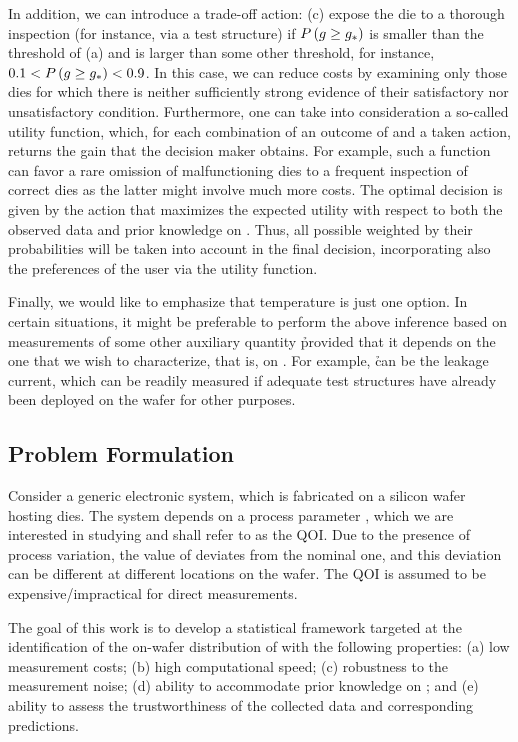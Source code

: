 In addition, we can introduce a trade-off action: (c) expose the die to a
thorough inspection (for instance, via a test structure) if $P\left(g
\geq g_*\right)$ is smaller than the threshold of (a) and is larger than some other
threshold, for instance, $0.1 < P\left(g \geq g_*\right) < 0.9$. In this case,
we can reduce costs by examining only those dies for which there is neither
sufficiently strong evidence of their satisfactory nor unsatisfactory condition.
Furthermore, one can take into consideration a so-called utility function,
which, for each combination of an outcome of \g and a taken action, returns the
gain that the decision maker obtains. For example, such a function can favor a
rare omission of malfunctioning dies to a frequent inspection of correct dies as
the latter might involve much more costs. The optimal decision is given by the
action that maximizes the expected utility with respect to both the observed
data and prior knowledge on \g. Thus, all possible \g weighted by their
probabilities will be taken into account in the final decision, incorporating
also the preferences of the user via the utility function.

Finally, we would like to emphasize that temperature is just one option. In
certain situations, it might be preferable to perform the above inference based
on measurements of some other auxiliary quantity \h provided that it depends on
the one that we wish to characterize, that is, on \g. For example, \h can be the
leakage current, which can be readily measured if adequate test structures have
already been deployed on the wafer for other purposes.

\subsection{Problem Formulation}

Consider a generic electronic system, which is fabricated on a silicon wafer
hosting \nd dies. The system depends on a process parameter \g, which we are
interested in studying and shall refer to as the \ac{QOI}. Due to the presence
of process variation, the value of \g deviates from the nominal one, and this
deviation can be different at different locations on the wafer. The \ac{QOI} is
assumed to be expensive/impractical for direct measurements.

The goal of this work is to develop a statistical framework targeted at the
identification of the on-wafer distribution of \g with the following properties:
(a) low measurement costs; (b) high computational speed; (c) robustness to the
measurement noise; (d) ability to accommodate prior knowledge on \g; and (e)
ability to assess the trustworthiness of the collected data and corresponding
predictions.

